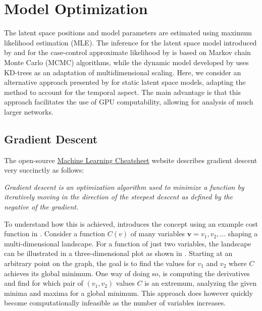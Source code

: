 \section{Model Optimization}\label{sec:model-opt}

The latent space positions and model parameters are estimated using maximum likelihood estimation (MLE). The inference for the latent space model introduced by \citeauthor*{hoff2002latent} and for the case-control approximate likelihood by \citeauthor*{raftery2012fast} is based on Markov chain Monte Carlo (MCMC) algorithms, while the dynamic model developed by \citeauthor{sarkar2005dynamic} uses KD-trees as an adaptation of multidimensional scaling. Here, we consider an alternative approach presented by \citeauthor{jacobsen2018a} for static latent space models, adapting the method to account for the temporal aspect. The main advantage is that this approach facilitates the use of GPU computability, allowing for analysis of much larger networks.

\subsection{Gradient Descent}

    The open-source \href{https://ml-cheatsheet.readthedocs.io/en/latest/index.html}{Machine Learning Cheatsheet} website describes gradient descent very succinctly as follows:
    \begin{displayquote}\itshape
        Gradient descent is an optimization algorithm used to minimize a function by iteratively moving in the direction of the steepest descent as defined by the negative of the gradient. 
    \end{displayquote}
    
    To understand how this is achieved, \citeauthor{nielsen2018neural} introduces the concept using an example cost function in \cite{nielsen2018neural}.
    Consider a function $C(v)$ of many variables $\bm{v} = v_1, v_2, \dots$ shaping a multi-dimensional landscape. For a function of just two variables, the landscape can be illustrated in a three-dimensional plot as shown in . 
    Starting at an arbitrary point on the graph, the goal is to find the values for $v_1$ and $v_2$ where $C$ achieves its global minimum. One way of doing so, is computing the derivatives and find for which pair of $(v_1,v_2)$ values $C$ is an extremum, analyzing the given minima and maxima for a global minimum. This approach does however quickly become computationally infeasible as the number of variables increases. 
    
